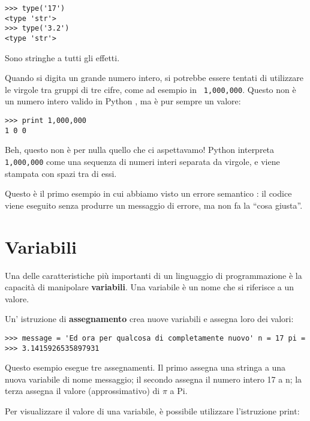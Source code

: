 
\beforeverb \begin{verbatim}
>>> type('17')
<type 'str'>
>>> type('3.2')
<type 'str'> \end{verbatim} \afterverb
%
Sono stringhe a tutti gli effetti.


Quando si digita un grande numero intero, si potrebbe essere tentati di
utilizzare le virgole tra gruppi di tre cifre, come ad esempio in {\tt
1,000,000}. Questo non \`{e} un numero intero valido in Python , ma
\`{e} pur sempre un valore:

\beforeverb \begin{verbatim}
>>> print 1,000,000
1 0 0 \end{verbatim} \afterverb
%
Beh, questo non \`{e} per nulla quello che ci aspettavamo! Python
interpreta {\tt 1,000,000} come una sequenza di numeri interi separata
da virgole, e viene stampata con spazi tra di essi.

  

Questo \`{e} il primo esempio in cui abbiamo visto un errore semantico :
il codice viene eseguito senza produrre un messaggio di errore, ma non
fa la {``}cosa giusta''.

\section{Variabili}  

Una delle caratteristiche pi\`{u} importanti di un linguaggio di
programmazione \`{e} la capacit\`{a} di manipolare \textbf{variabili}.
Una variabile \`{e} un nome che si riferisce a un valore.

Un' istruzione di \textbf{assegnamento} crea nuove variabili e assegna
loro dei valori:

\beforeverb \begin{verbatim}
>>> message = 'Ed ora per qualcosa di completamente nuovo' n = 17 pi =
>>> 3.1415926535897931
\end{verbatim} \afterverb
%
%
Questo esempio esegue tre assegnamenti. Il primo assegna una stringa a
una nuova variabile di nome messaggio; il secondo assegna il numero
intero 17 a n; la terza assegna il valore (approssimativo) di $\pi$ a
Pi.


Per visualizzare il valore di una variabile, \`{e} possibile utilizzare
l'istruzione print:

